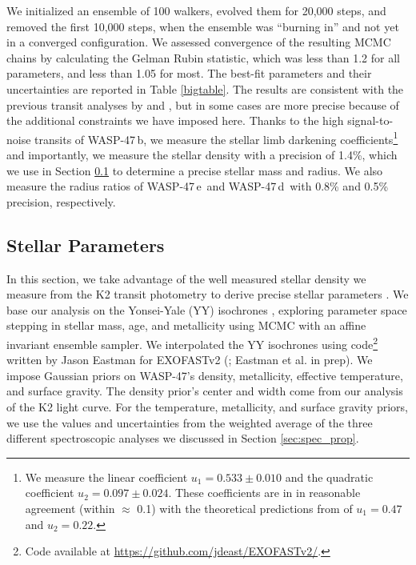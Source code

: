 \documentclass{emulateapj}
\newcommand{\thisstar}{WASP-47}
\newcommand{\thisfirstplanet}{WASP-47\,b}
\newcommand{\thissecondplanet}{WASP-47\,e}
\newcommand{\thisthirdplanet}{WASP-47\,d}
\begin{document}
We initialized an ensemble of 100 walkers, evolved them for 20,000 steps, and removed the first 10,000 steps, when the ensemble was ``burning in'' and not yet in a converged configuration. We assessed convergence of the resulting MCMC chains by calculating the Gelman Rubin statistic, which was less than 1.2 for all parameters, and less than 1.05 for most. The best-fit parameters and their uncertainties are reported in Table \ref{bigtable}. The results are consistent with the previous transit analyses by \citet{becker} and \citet{almenara}, but in some cases are more precise because of the additional constraints we have imposed here. Thanks to the high signal-to-noise transits of \thisfirstplanet, we measure the stellar limb darkening coefficients\footnote{We measure the linear coefficient $u_1 = 0.533 \pm 0.010$ and the quadratic coefficient $u_2 = 0.097 \pm 0.024$. These coefficients are in in reasonable agreement (within $\approx$ 0.1) with the theoretical predictions from \citet{claretbloemen} of $u_1 = 0.47$ and $u_2 = 0.22$.} and importantly, we measure the stellar density with a precision of 1.4\%, which we use in Section \ref{sec:stellar_prop} to determine a precise stellar mass and radius. We also measure the radius ratios of \thissecondplanet\ and \thisthirdplanet\ with 0.8\% and 0.5\% precision, respectively. 




\subsection{Stellar Parameters}
\label{sec:stellar_prop}

In this section, we take advantage of the well measured stellar density we measure from the K2 transit photometry to derive precise stellar parameters \citep[as has been done previously for other hot Jupiter hosts, e.g.][]{sozzetti07}. We base our analysis on the Yonsei-Yale (YY) isochrones \citep{Yi:2001}, exploring parameter space stepping in stellar mass, age, and metallicity using MCMC with an affine invariant ensemble sampler. We interpolated the YY isochrones using code\footnote{Code available at \url{https://github.com/jdeast/EXOFASTv2/}.} written by Jason Eastman for EXOFASTv2 (\citealt{exofast, rodriguez}; Eastman et al. in prep).  We impose Gaussian priors on \thisstar's density, metallicity, effective temperature, and surface gravity. The density prior's center and width come from our analysis of the K2 light curve. For the temperature, metallicity, and surface gravity priors, we use the values and uncertainties from the weighted average of the three different spectroscopic analyses we discussed in Section \ref{sec:spec_prop}. 
\end{document}

